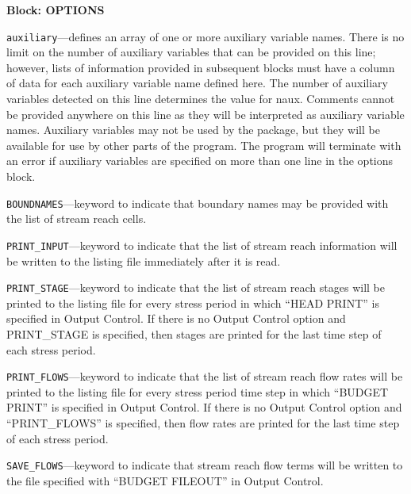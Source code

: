 
\item \textbf{Block: OPTIONS}

\begin{description}
\item \texttt{auxiliary}---defines an array of one or more auxiliary variable names.  There is no limit on the number of auxiliary variables that can be provided on this line; however, lists of information provided in subsequent blocks must have a column of data for each auxiliary variable name defined here.   The number of auxiliary variables detected on this line determines the value for naux.  Comments cannot be provided anywhere on this line as they will be interpreted as auxiliary variable names.  Auxiliary variables may not be used by the package, but they will be available for use by other parts of the program.  The program will terminate with an error if auxiliary variables are specified on more than one line in the options block.

\item \texttt{BOUNDNAMES}---keyword to indicate that boundary names may be provided with the list of stream reach cells.

\item \texttt{PRINT\_INPUT}---keyword to indicate that the list of stream reach information will be written to the listing file immediately after it is read.

\item \texttt{PRINT\_STAGE}---keyword to indicate that the list of stream reach stages will be printed to the listing file for every stress period in which ``HEAD PRINT'' is specified in Output Control.  If there is no Output Control option and PRINT\_STAGE is specified, then stages are printed for the last time step of each stress period.

\item \texttt{PRINT\_FLOWS}---keyword to indicate that the list of stream reach flow rates will be printed to the listing file for every stress period time step in which ``BUDGET PRINT'' is specified in Output Control.  If there is no Output Control option and ``PRINT\_FLOWS'' is specified, then flow rates are printed for the last time step of each stress period.

\item \texttt{SAVE\_FLOWS}---keyword to indicate that stream reach flow terms will be written to the file specified with ``BUDGET FILEOUT'' in Output Control.


\end{description}
